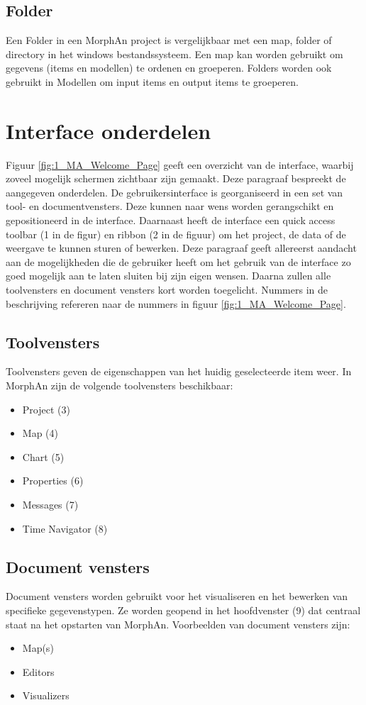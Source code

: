 \subsection{Folder}
Een Folder in een MorphAn project is vergelijkbaar met een map, folder of directory in het windows bestandssysteem. Een map kan worden gebruikt om gegevens (items en modellen) te ordenen en groeperen. Folders worden ook gebruikt in Modellen om input items en output items te groeperen.

\section{Interface onderdelen}
	\label{sec:DS:InterfaceOnderdelen}
Figuur \ref{fig:1_MA_Welcome_Page} geeft een overzicht van de interface, waarbij zoveel mogelijk schermen zichtbaar zijn gemaakt. Deze paragraaf bespreekt de aangegeven onderdelen. De gebruikersinterface is georganiseerd in een set van tool- en documentvensters. Deze kunnen naar wens worden gerangschikt en gepositioneerd in de interface. Daarnaast heeft de interface een quick access toolbar (1 in de figur) en ribbon (2 in de figuur) om het project, de data of de weergave te kunnen sturen of bewerken. Deze paragraaf geeft allereerst aandacht aan de mogelijkheden die de gebruiker heeft om het gebruik van de interface zo goed mogelijk aan te laten sluiten bij zijn eigen wensen. Daarna zullen alle toolvensters en document vensters kort worden toegelicht. Nummers in de beschrijving refereren naar de nummers in figuur \ref{fig:1_MA_Welcome_Page}.

\subsection*{Toolvensters}
Toolvensters geven de eigenschappen van het huidig geselecteerde item weer. In MorphAn zijn de volgende toolvensters beschikbaar:
\begin{itemize}
\item Project (3)
\item Map (4)
\item Chart (5)
\item Properties (6)
\item Messages (7)
\item Time Navigator (8)
\end{itemize}

\subsection*{Document vensters}
Document vensters worden gebruikt voor het visualiseren en het bewerken van specifieke gegevenstypen. Ze worden geopend in het hoofdvenster (9) dat centraal staat na het opstarten van MorphAn. Voorbeelden van document vensters zijn:
\begin{itemize}
\item Map(s)
\item Editors
\item Visualizers
\end{itemize}

